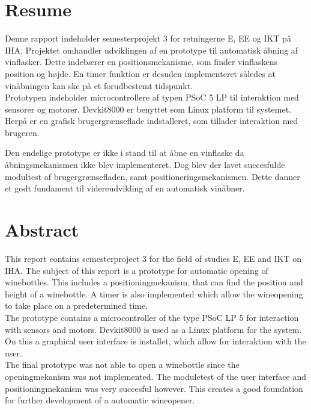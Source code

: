 \chapter{Resume}

Denne rapport indeholder semesterprojekt 3 for retningerne E, EE og IKT på IHA. Projektet omhandler udviklingen af en
prototype til automatisk åbning af vinflasker. Dette indebærer en positionsmekanisme, som finder vinflaskens position og højde.
En timer funktion er desuden implementeret således at vinåbningen kan ske på et forudbestemt tidspunkt.\\

Prototypen indeholder microcontrollere af typen PSoC 5 LP til interaktion med sensorer og motorer. Devkit8000 er benyttet som 
Linux platform til systemet. Herpå er en grafisk brugergrænseflade indstalleret, som tillader interaktion med brugeren.   

Den endelige prototype er ikke i stand til at åbne en vinflaske da åbningsmekanismen ikke blev implementeret. Dog blev der lavet 
succesfulde modultest af brugergrænsefladen, samt positioneringsmekanismen. Dette danner et godt fundament til videreudvikling af
en automatisk vinåbner. 

\chapter{Abstract}

This report contains semesterproject 3 for the field of studies E, EE and IKT on IHA. The subject of this report is a prototype 
for automatic opening of winebottles. This includes a positioningmekanism, that can find the position and height of a winebottle.
A timer is also implemented which allow the wineopening to take place on a predetermined time.\\

The prototype contains a microcontroller of the type PSoC LP 5 for interaction with sensors and motors. Devkit8000 is used as a
Linux platform for the system. On this a graphical user interface is installet, which allow for interaktion with the user.\\

The final prototype was not able to open a winebottle since the openingmekanism was not implemented. The moduletest of the
user interface and positioningmekanism was very succesful however. This creates a good foundation for further development of
a automatic wineopener.      